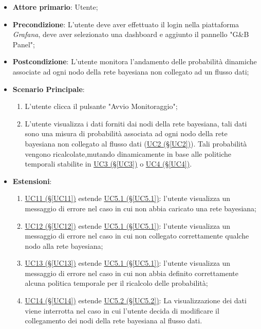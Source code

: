 \begin{itemize}
\item \textbf{Attore primario}: Utente;
\item \textbf{Precondizione}: L'utente deve aver effettuato il login nella piattaforma \textit{Grafana}, deve aver selezionato una dashboard e aggiunto il pannello "G\&B Panel";
\item \textbf{Postcondizione}: L'utente monitora l'andamento delle probabilità dinamiche associate ad ogni nodo della rete bayesiana non collegato ad un flusso dati;
\item \textbf{Scenario Principale}: 
	\begin{enumerate}
	\item L'utente clicca il pulsante "Avvio Monitoraggio";
	\item L'utente visualizza i dati forniti dai nodi della rete bayesiana, tali dati sono una misura di probabilità 			associata ad ogni nodo della rete bayesiana non collegato al flusso dati (\hyperref[UC2]{UC2 (§\ref*{UC2})}). 				Tali probabilità vengono ricalcolate,mutando dinamicamente in base alle politiche temporali stabilite in 						\hyperref[UC3]{UC3 (§\ref*{UC3})} o \hyperref[UC4]{UC4 (§\ref*{UC4})}.
	\end{enumerate}
\item \textbf{Estensioni}:
	\begin{enumerate}
	\item \hyperref[UC11]{UC11 (§\ref*{UC11})} estende \hyperref[UC5.1]{UC5.1 (§\ref*{UC5.1})}: l'utente visualizza 				un messaggio di errore nel caso in cui non abbia caricato una rete bayesiana;
	\item \hyperref[UC12]{UC12 (§\ref*{UC12})} estende \hyperref[UC5.1]{UC5.1 (§\ref*{UC5.1})}: l'utente visualizza 				un messaggio di errore nel caso in cui non collegato correttamente qualche nodo alla rete bayesiana;
	\item \hyperref[UC13]{UC13 (§\ref*{UC13})} estende \hyperref[UC5.1]{UC5.1 (§\ref*{UC5.1})}: l'utente visualizza 				un messaggio di errore nel caso in cui non abbia definito correttamente alcuna politica temporale per il 						ricalcolo delle probabilità;
	\item \hyperref[UC14]{UC14 (§\ref*{UC14})} estende \hyperref[UC5.2]{UC5.2 (§\ref*{UC5.2})}: La visualizzazione 				dei dati viene interrotta nel caso in cui l'utente decida di modificare il collegamento dei nodi della rete 					bayesiana al flusso dati.
	\end{enumerate}
\end{itemize}

